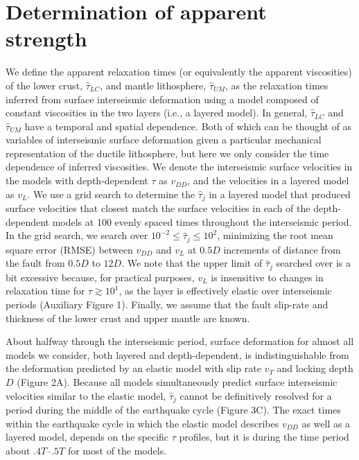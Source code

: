 \section{Determination of apparent strength}
We define the apparent relaxation times (or equivalently the apparent
viscosities) of the lower crust, $\hat{\tau}_{LC}$, and mantle
lithosphere, $\hat{\tau}_{UM}$, as the relaxation times inferred from
surface interseismic deformation using a model composed of constant
viscosities in the two layers (i.e., a layered model). In
general, $\hat{\tau}_{LC}$ and $\hat{\tau}_{UM}$ have a temporal
\citep{Riva2009} and spatial \citep{Yamasaki2012} dependence.  Both of
which can be thought of as variables of interseismic surface
deformation given a particular mechanical representation of the
ductile lithosphere, but here we only consider the time dependence of
inferred viscosities.  We denote the interseismic surface velocities
in the models with depth-dependent $\tau$ as $v_{DD}$, and the
velocities in a layered model as $v_{L}$.  We use a grid search to
determine the $\hat{\tau}_j$ in a layered model that produced surface
velocities that closest match the surface velocities in each of the
depth-dependent models at 100 evenly spaced times throughout the
interseismic period.  In the grid search, we search over $10^{-2} \leq
\hat{\tau}_j \leq 10^2$, minimizing the root mean square error (RMSE)
between $v_{DD}$ and $v_L$ at $0.5D$ increments of distance from the
fault from $0.5D$ to $12D$\@.  We note that the upper limit of
$\hat{\tau}_j$ searched over is a bit excessive because, for practical
purposes, $v_{L}$ is insensitive to changes in relaxation time for
$\tau \gtrsim 10^1$, as the layer is effectively elastic over
interseismic periods \citep{Savage1978} (Auxiliary Figure 1).
Finally, we assume that the fault slip-rate and thickness of the lower
crust and upper mantle are known.

About halfway through the interseismic period, surface deformation for
almost all models we consider, both layered and depth-dependent, is
indistinguishable from the deformation predicted by an elastic model
with slip rate $v_T$ and locking depth $D$ \citep{Savage1973a} (Figure
2A). Because all models simultaneously predict surface interseismic
velocities similar to the elastic model, $\hat{\tau}_j$ cannot be
definitively resolved for a period during the middle of the earthquake
cycle (Figure 3C). The exact times within the earthquake cycle in
which the elastic model describes $v_{DD}$ as well as a layered model,
depends on the specific $\tau$ profiles, but it is during the time
period about $.4T$--$.5T$ for most of the models.

